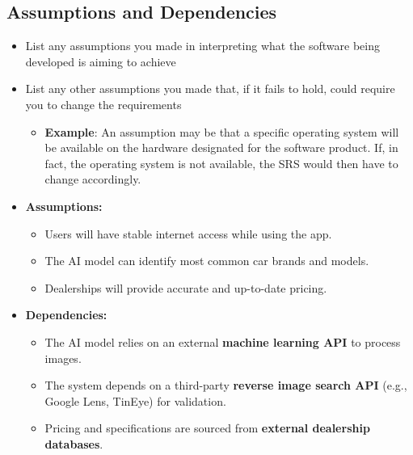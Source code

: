 \documentclass[]{article}
\begin{document}
\subsection{Assumptions and Dependencies}
\label{sub:assumptions_and_dependencies}
\begin{itemize}
	\item List any assumptions you made in interpreting what the software being developed is aiming to achieve
	\item List any other assumptions you made that, if it fails to hold, could require you to change the requirements
	\begin{itemize}
		\item \textbf{Example}: An assumption may be that a specific operating system will be available on the hardware designated for the software product. If, in fact, the operating system is not available, the SRS would then have to change accordingly.
	\end{itemize}

	\item \textbf{Assumptions:}
    \begin{itemize}
        \item Users will have stable internet access while using the app.
        \item The AI model can identify most common car brands and models.
        \item Dealerships will provide accurate and up-to-date pricing.
    \end{itemize}
    \item \textbf{Dependencies:}
    \begin{itemize}
        \item The AI model relies on an external \textbf{machine learning API} to process images.
        \item The system depends on a third-party \textbf{reverse image search API} (e.g., Google Lens, TinEye) for validation.
        \item Pricing and specifications are sourced from \textbf{external dealership databases}.
    \end{itemize}

\end{itemize}
\end{document}
